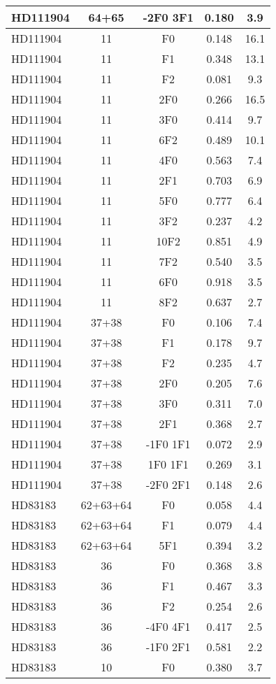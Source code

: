 \begin{table*}
\begin{tabular}{l c c c c}
HD111904 & 64+65 & -2F0 3F1 & 0.180 & 3.9\\ 
\hline
HD111904 & 11 & F0 & 0.148 & 16.1\\ 
HD111904 & 11 & F1 & 0.348 & 13.1\\ 
HD111904 & 11 & F2 & 0.081 & 9.3\\ 
HD111904 & 11 & 2F0 & 0.266 & 16.5\\ 
HD111904 & 11 & 3F0 & 0.414 & 9.7\\ 
HD111904 & 11 & 6F2 & 0.489 & 10.1\\ 
HD111904 & 11 & 4F0 & 0.563 & 7.4\\ 
HD111904 & 11 & 2F1 & 0.703 & 6.9\\ 
HD111904 & 11 & 5F0 & 0.777 & 6.4\\ 
HD111904 & 11 & 3F2 & 0.237 & 4.2\\ 
HD111904 & 11 & 10F2 & 0.851 & 4.9\\ 
HD111904 & 11 & 7F2 & 0.540 & 3.5\\ 
HD111904 & 11 & 6F0 & 0.918 & 3.5\\ 
HD111904 & 11 & 8F2 & 0.637 & 2.7\\ 
\hline
HD111904 & 37+38 & F0 & 0.106 & 7.4\\ 
HD111904 & 37+38 & F1 & 0.178 & 9.7\\ 
HD111904 & 37+38 & F2 & 0.235 & 4.7\\ 
HD111904 & 37+38 & 2F0 & 0.205 & 7.6\\ 
HD111904 & 37+38 & 3F0 & 0.311 & 7.0\\ 
HD111904 & 37+38 & 2F1 & 0.368 & 2.7\\ 
HD111904 & 37+38 & -1F0 1F1 & 0.072 & 2.9\\ 
HD111904 & 37+38 & 1F0 1F1 & 0.269 & 3.1\\ 
HD111904 & 37+38 & -2F0 2F1 & 0.148 & 2.6\\ 
\hline
HD83183 & 62+63+64 & F0 & 0.058 & 4.4\\ 
HD83183 & 62+63+64 & F1 & 0.079 & 4.4\\ 
HD83183 & 62+63+64 & 5F1 & 0.394 & 3.2\\ 
\hline
HD83183 & 36 & F0 & 0.368 & 3.8\\ 
HD83183 & 36 & F1 & 0.467 & 3.3\\ 
HD83183 & 36 & F2 & 0.254 & 2.6\\ 
HD83183 & 36 & -4F0 4F1 & 0.417 & 2.5\\ 
HD83183 & 36 & -1F0 2F1 & 0.581 & 2.2\\ 
\hline
HD83183 & 10 & F0 & 0.380 & 3.7\\ 

\end{tabular}
\end{table*}
